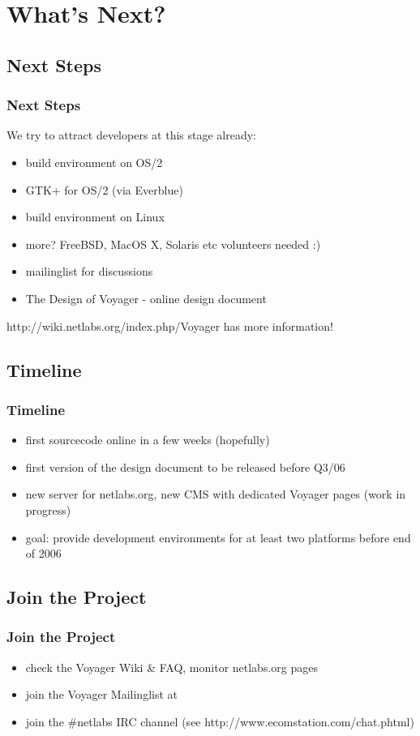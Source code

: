 \documentclass[handout]{beamer}
\begin{document}
\section{What's Next?}
\subsection{Next Steps}
\begin{frame}
\frametitle{Next Steps}
	We try to attract developers at this stage already:
	\begin{itemize}
		\item build environment on OS/2
		\item GTK+ for OS/2 (via Everblue)
		\item build environment on Linux
		\item more? FreeBSD, MacOS X, Solaris etc volunteers needed :)
		\item mailinglist for discussions
		\item The Design of Voyager - online design document
	\end{itemize}
	http://wiki.netlabs.org/index.php/Voyager has more information!
\end{frame}

\subsection{Timeline}
\begin{frame}
\frametitle{Timeline}
\begin{itemize}
  \item first sourcecode online in a few weeks (hopefully)
  \item first version of the design document to be released before Q3/06
  \item new server for netlabs.org, new CMS with dedicated Voyager pages (work in progress)
  \item goal: provide development environments for at least two platforms before end of 2006
\end{itemize}
\end{frame}

\subsection{Join the Project}
\begin{frame}
\frametitle{Join the Project}
\begin{itemize}
  \item check the Voyager Wiki & FAQ, monitor netlabs.org pages
  \item join the Voyager Mailinglist at 
  \item join the #netlabs IRC channel (see http://www.ecomstation.com/chat.phtml)
\end{itemize}
\end{frame}
\end{document}
